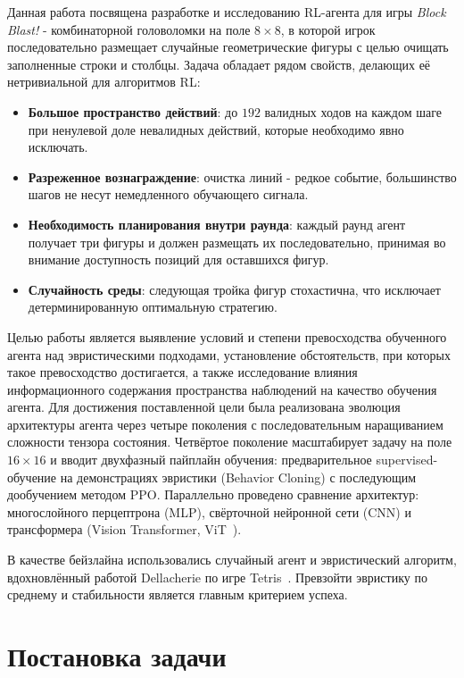 \documentclass[12pt, a4paper]{article}
\begin{document}
Данная работа посвящена разработке и исследованию RL-агента для игры \textit{Block Blast!} - комбинаторной головоломки на поле $8 \times 8$, в которой игрок последовательно размещает случайные геометрические фигуры с целью очищать заполненные строки и столбцы. Задача обладает рядом свойств, делающих её нетривиальной для алгоритмов RL:

\begin{itemize}
  \item \textbf{Большое пространство действий}: до $192$ валидных ходов на каждом шаге при ненулевой доле невалидных действий, которые необходимо явно исключать.
  \item \textbf{Разреженное вознаграждение}: очистка линий - редкое событие, большинство шагов не несут немедленного обучающего сигнала.
  \item \textbf{Необходимость планирования внутри раунда}: каждый раунд агент получает три фигуры и должен размещать их последовательно, принимая во внимание доступность позиций для оставшихся фигур.
  \item \textbf{Случайность среды}: следующая тройка фигур стохастична, что исключает \\ детерминированную оптимальную стратегию.
\end{itemize}

Целью работы является выявление условий и степени превосходства обученного агента над эвристическими подходами, установление обстоятельств, при которых такое превосходство достигается, а также исследование влияния информационного содержания пространства наблюдений на качество обучения агента. Для достижения поставленной цели была реализована эволюция архитектуры агента через четыре поколения с последовательным наращиванием сложности тензора состояния. Четвёртое поколение масштабирует задачу на поле $16\times16$ и вводит двухфазный пайплайн обучения: предварительное supervised-обучение на демонстрациях эвристики (Behavior Cloning) с последующим дообучением методом PPO. Параллельно проведено сравнение архитектур: многослойного перцептрона (MLP), свёрточной нейронной сети (CNN) и трансформера (Vision Transformer, ViT~\cite{dosovitskiy2020}).

В качестве бейзлайна использовались случайный агент и эвристический алгоритм, вдохновлённый работой Dellacherie по игре Tetris~\cite{dellacherie2003}. Превзойти эвристику по среднему и стабильности является главным критерием успеха.

\section{Постановка задачи}
\end{document}
